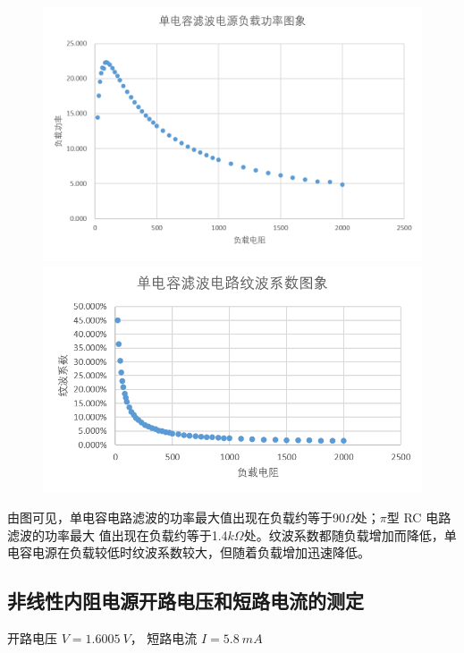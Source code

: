 \documentclass{article}
\begin{document}
\begin{figure}[tbp]
    \centering
    \begin{minipage}[t]{0.48\textwidth}
        \centering
        \includegraphics[scale=0.5]{ddrgl.png}

    \end{minipage}
    \begin{minipage}[t]{0.48\textwidth}
        \centering
        \includegraphics[scale=0.75]{ddrwb.png}
    \end{minipage}
\end{figure}

由图可见，单电容电路滤波的功率最大值出现在负载约等于90$\Omega$处；$\pi$型 RC 电路滤波的功率最大
值出现在负载约等于1.4$k\Omega$处。纹波系数都随负载增加而降低，单电容电源在负载较低时纹波系数较大，但随着负载增加迅速降低。
\newpage
\subsection*{非线性内阻电源开路电压和短路电流的测定}
开路电压 $V=\SI{1.6005}{V}$， 短路电流 $I=\SI{5.8}{mA}$
\end{document}
